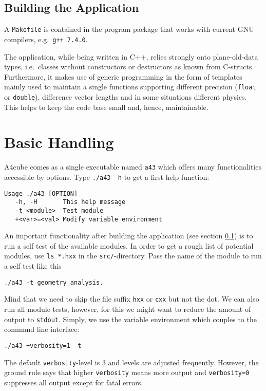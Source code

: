 \documentclass[oribibl]{llncs}
\newcommand{\ttt}[1]{\texttt{#1}}
\newcommand{\codename}{A4cube}
\begin{document}
\subsection{Building the Application} \label{sec:compiling}
A \ttt{Makefile} is contained in the program package that works with current GNU compilers, e.g.~\ttt{g++ 7.4.0}.

The application, while being written in C++, relies strongly onto plane-old-data types,
i.e.~classes without constructors or destructors as known from C-structs.
Furthermore, it makes use of generic programming in the form of templates
mainly used to maintain a single functions supporting different precision (\ttt{float} or \ttt{double}), 
difference vector lengths and in some situations different physics. 
This helps to keep the code base small and, hence, maintainable.

\section{Basic Handling}
\codename{} comes as a single executable named \ttt{a43} which
offers many functionalities accessible by options. Type \ttt{./a43 -h}
to get a first help function:
\begin{verbatim}
Usage ./a43 [OPTION]
   -h, -H       This help message
   -t <module>  Test module
   +<var>=<val> Modify variable environment
\end{verbatim}

An important functionality after building the application (see section \ref{sec:compiling}) 
is to run a self test of the available modules.
In order to get a rough list of potential modules, 
use \ttt{ls *.hxx} in the \ttt{src/}-directory.
Pass the name of the module to run a self test like this
\begin{verbatim}
./a43 -t geometry_analysis.
\end{verbatim}
Mind that we need to skip the file suffix \ttt{hxx} or \ttt{cxx} but not the dot.
We can also run all module tests, however, for this we might want to reduce
the amount of output to \ttt{stdout}. 
Simply, we use the variable environment which couples to the command line interface:
\begin{verbatim}
./a43 +verbosity=1 -t
\end{verbatim}
The default \ttt{verbosity}-level is $3$ and levels are adjusted frequently.
However, the ground rule says that higher \ttt{verbosity} means more output
and \ttt{verbosity=0} suppresses all output except for fatal errors.
\end{document}
